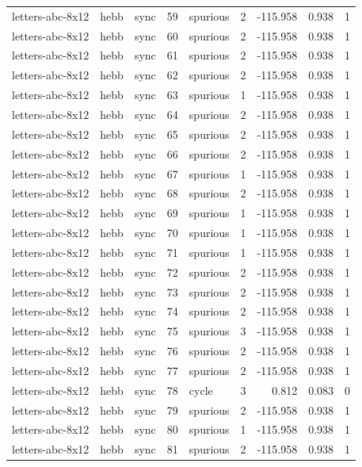 \begin{tabular}{lllrlrrrr}
letters-abc-8x12 & hebb & sync & 59 & spurious & 2 & -115.958 & 0.938 & 1 \\
letters-abc-8x12 & hebb & sync & 60 & spurious & 2 & -115.958 & 0.938 & 1 \\
letters-abc-8x12 & hebb & sync & 61 & spurious & 2 & -115.958 & 0.938 & 1 \\
letters-abc-8x12 & hebb & sync & 62 & spurious & 2 & -115.958 & 0.938 & 1 \\
letters-abc-8x12 & hebb & sync & 63 & spurious & 1 & -115.958 & 0.938 & 1 \\
letters-abc-8x12 & hebb & sync & 64 & spurious & 2 & -115.958 & 0.938 & 1 \\
letters-abc-8x12 & hebb & sync & 65 & spurious & 2 & -115.958 & 0.938 & 1 \\
letters-abc-8x12 & hebb & sync & 66 & spurious & 2 & -115.958 & 0.938 & 1 \\
letters-abc-8x12 & hebb & sync & 67 & spurious & 1 & -115.958 & 0.938 & 1 \\
letters-abc-8x12 & hebb & sync & 68 & spurious & 2 & -115.958 & 0.938 & 1 \\
letters-abc-8x12 & hebb & sync & 69 & spurious & 1 & -115.958 & 0.938 & 1 \\
letters-abc-8x12 & hebb & sync & 70 & spurious & 1 & -115.958 & 0.938 & 1 \\
letters-abc-8x12 & hebb & sync & 71 & spurious & 1 & -115.958 & 0.938 & 1 \\
letters-abc-8x12 & hebb & sync & 72 & spurious & 2 & -115.958 & 0.938 & 1 \\
letters-abc-8x12 & hebb & sync & 73 & spurious & 2 & -115.958 & 0.938 & 1 \\
letters-abc-8x12 & hebb & sync & 74 & spurious & 2 & -115.958 & 0.938 & 1 \\
letters-abc-8x12 & hebb & sync & 75 & spurious & 3 & -115.958 & 0.938 & 1 \\
letters-abc-8x12 & hebb & sync & 76 & spurious & 2 & -115.958 & 0.938 & 1 \\
letters-abc-8x12 & hebb & sync & 77 & spurious & 2 & -115.958 & 0.938 & 1 \\
letters-abc-8x12 & hebb & sync & 78 & cycle & 3 & 0.812 & 0.083 & 0 \\
letters-abc-8x12 & hebb & sync & 79 & spurious & 2 & -115.958 & 0.938 & 1 \\
letters-abc-8x12 & hebb & sync & 80 & spurious & 1 & -115.958 & 0.938 & 1 \\
letters-abc-8x12 & hebb & sync & 81 & spurious & 2 & -115.958 & 0.938 & 1 \\

\end{tabular}
